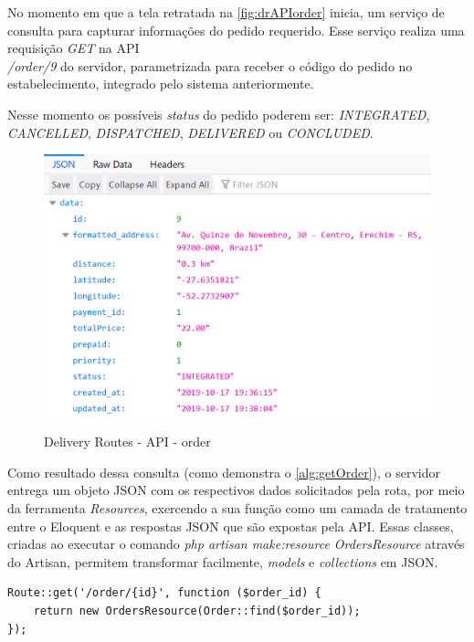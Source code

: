 No momento em que a tela retratada na \autoref{fig:drAPIorder} inicia, um serviço de consulta para capturar informações do pedido requerido. Esse serviço realiza uma requisição \textit{GET} na API 
\\ \textit{/order/9} do servidor, parametrizada para receber o código do pedido no estabelecimento, integrado pelo sistema anteriormente.

Nesse momento os possíveis \textit{status} do pedido poderem ser: \textit{INTEGRATED},
\\ \textit{CANCELLED}, \textit{DISPATCHED}, \textit{DELIVERED} ou \textit{CONCLUDED}.

\begin{figure}[H]
    \centering
    \caption{Delivery Routes - API - order}
    \includegraphics[width=1.0\textwidth]{./dados/figuras/fig22}
    \label{fig:drAPIorder}
\end{figure}

Como resultado dessa consulta (como demonstra o \autoref{alg:getOrder}), o servidor entrega um objeto JSON com os respectivos dados solicitados pela rota, por meio da ferramenta  \textit{Resources}, exercendo a sua função como um camada de tratamento entre o Eloquent e as respostas JSON que são expostas pela API. Essas classes, criadas ao executar o comando \textit{php artisan make:resource OrdersResource} através do Artisan, permitem transformar facilmente, \textit{models} e \textit{collections} em JSON.

\begin{lstlisting}[caption={Delivery Routes - Rota order}, style=htmlcssjs, label=alg:getOrder]
Route::get('/order/{id}', function ($order_id) {
    return new OrdersResource(Order::find($order_id));
});
\end{lstlisting}